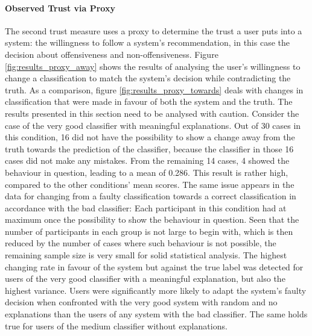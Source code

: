 \paragraph{Observed Trust via Proxy}
The second trust measure uses a proxy to determine the trust a user puts into a system: the willingness to follow a system's recommendation, in this case the decision about offensiveness and non-offensiveness. Figure \ref{fig:results_proxy_away} shows the results of analysing the user's willingness to change a classification to match the system's decision while contradicting the truth. As a comparison, figure \ref{fig:results_proxy_towards} deals with changes in classification that were made in favour of both the system and the truth.\newline
The results presented in this section need to be analysed with caution. Consider the case of the very good classifier with meaningful explanations. Out of 30 cases in this condition, 16 did not have the possibility to show a change away from the truth towards the prediction of the classifier, because the classifier in those 16 cases did not make any mistakes. From the remaining 14 cases, 4 showed the behaviour in question, leading to a mean of 0.286. This result is rather high, compared to the other conditions' mean scores. The same issue appears in the data for changing from a faulty classification towards a correct classification in accordance with the bad classifier: Each participant in this condition had at maximum once the possibility to show the behaviour in question. Seen that the number of participants in each group is not large to begin with, which is then reduced by the number of cases where such behaviour is not possible, the remaining sample size is very small for solid statistical analysis.\newline
The highest changing rate in favour of the system but against the true label was detected for users of the very good classifier with a meaningful explanation, but also the highest variance. Users were significantly more likely to adapt the system's faulty decision when confronted with the very good system with random and no explanations than the users of any system with the bad classifier. The same holds true for users of the medium classifier without explanations.\newline


